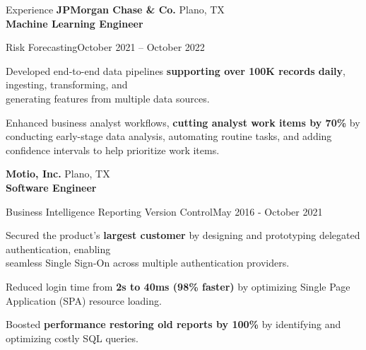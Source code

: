 \documentclass[
	9pt, %
]{resume} %
\begin{document}
\begin{rSection}{Experience}
    \textbf{JPMorgan Chase \& Co.} \hfill {Plano, TX } \\
    \textbf{Machine Learning Engineer}
    \begin{rSubsection}{Risk Forecasting}{October 2021 -- October 2022}
        \item Developed end-to-end data pipelines \textbf{supporting over 100K records daily}, ingesting, transforming, and \\generating features from multiple data sources.
        \item Enhanced business analyst workflows, \textbf{cutting analyst work items by 70\%} by conducting early-stage data analysis, automating routine tasks, and adding confidence intervals to help prioritize work items.
    \end{rSubsection}


    \textbf{Motio, Inc.} \hfill {Plano, TX } \\
    \textbf{Software Engineer}
    \begin{rSubsection}{Business Intelligence Reporting Version Control}{May 2016 - October 2021}
        \item Secured the product’s \textbf{largest customer} by designing and prototyping delegated authentication, enabling \\seamless Single Sign-On across multiple authentication providers.
        \item Reduced login time from \textbf{2s to 40ms (98\% faster)} by optimizing Single Page Application (SPA) resource loading.
        \item Boosted \textbf{performance restoring old reports by 100\%} by identifying and optimizing costly SQL queries.
	\end{rSubsection}

\end{rSection}
\end{document}
